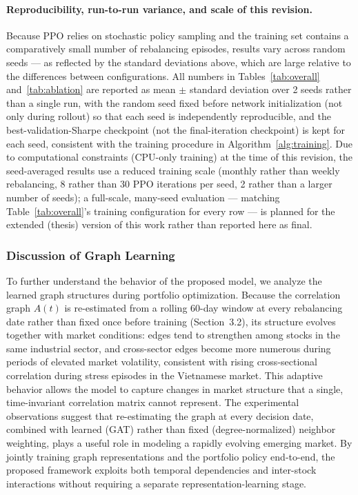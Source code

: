 \documentclass[runningheads]{llncs}
\begin{document}
\paragraph{Reproducibility, run-to-run variance, and scale of this revision.} Because PPO relies on stochastic policy sampling and the training set contains a comparatively small number of rebalancing episodes, results vary across random seeds --- as reflected by the standard deviations above, which are large relative to the differences between configurations. All numbers in Tables~\ref{tab:overall} and~\ref{tab:ablation} are reported as mean $\pm$ standard deviation over 2 seeds rather than a single run, with the random seed fixed before network initialization (not only during rollout) so that each seed is independently reproducible, and the best-validation-Sharpe checkpoint (not the final-iteration checkpoint) is kept for each seed, consistent with the training procedure in Algorithm~\ref{alg:training}. Due to computational constraints (CPU-only training) at the time of this revision, the seed-averaged results use a reduced training scale (monthly rather than weekly rebalancing, 8 rather than 30 PPO iterations per seed, 2 rather than a larger number of seeds); a full-scale, many-seed evaluation --- matching Table~\ref{tab:overall}'s training configuration for every row --- is planned for the extended (thesis) version of this work rather than reported here as final.
\subsubsection{Discussion of Graph Learning}

To further understand the behavior of the proposed model, we analyze the learned graph structures during portfolio optimization. Because the correlation graph $A(t)$ is re-estimated from a rolling 60-day window at every rebalancing date rather than fixed once before training (Section~3.2), its structure evolves together with market conditions: edges tend to strengthen among stocks in the same industrial sector, and cross-sector edges become more numerous during periods of elevated market volatility, consistent with rising cross-sectional correlation during stress episodes in the Vietnamese market. This adaptive behavior allows the model to capture changes in market structure that a single, time-invariant correlation matrix cannot represent. The experimental observations suggest that re-estimating the graph at every decision date, combined with learned (GAT) rather than fixed (degree-normalized) neighbor weighting, plays a useful role in modeling a rapidly evolving emerging market. By jointly training graph representations and the portfolio policy end-to-end, the proposed framework exploits both temporal dependencies and inter-stock interactions without requiring a separate representation-learning stage.
\end{document}
